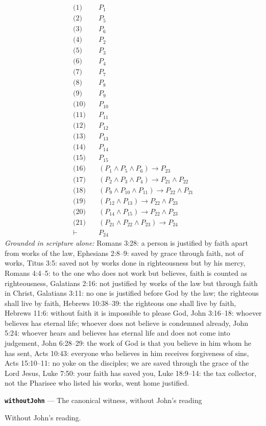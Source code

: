 \documentclass[11pt]{article}
\begin{document}
\begin{align*}
  \text{(1)} \quad & P_{1} \\
  \text{(2)} \quad & P_{5} \\
  \text{(3)} \quad & P_{6} \\
  \text{(4)} \quad & P_{2} \\
  \text{(5)} \quad & P_{3} \\
  \text{(6)} \quad & P_{4} \\
  \text{(7)} \quad & P_{7} \\
  \text{(8)} \quad & P_{8} \\
  \text{(9)} \quad & P_{9} \\
  \text{(10)} \quad & P_{10} \\
  \text{(11)} \quad & P_{11} \\
  \text{(12)} \quad & P_{12} \\
  \text{(13)} \quad & P_{13} \\
  \text{(14)} \quad & P_{14} \\
  \text{(15)} \quad & P_{15} \\
  \text{(16)} \quad & (P_{1} \land P_{5} \land P_{6}) \rightarrow P_{23} \\
  \text{(17)} \quad & (P_{2} \land P_{3} \land P_{4}) \rightarrow P_{21} \land P_{22} \\
  \text{(18)} \quad & (P_{9} \land P_{10} \land P_{11}) \rightarrow P_{22} \land P_{21} \\
  \text{(19)} \quad & (P_{12} \land P_{13}) \rightarrow P_{22} \land P_{23} \\
  \text{(20)} \quad & (P_{14} \land P_{15}) \rightarrow P_{22} \land P_{23} \\
  \text{(21)} \quad & (P_{21} \land P_{22} \land P_{23}) \rightarrow P_{24} \\
  \vdash \quad & P_{24}
\end{align*}
\emph{Grounded in scripture alone:} Romans 3:28: a person is justified by faith apart from works of the law, Ephesians 2:8–9: saved by grace through faith, not of works, Titus 3:5: saved not by works done in righteousness but by his mercy, Romans 4:4–5: to the one who does not work but believes, faith is counted as righteousness, Galatians 2:16: not justified by works of the law but through faith in Christ, Galatians 3:11: no one is justified before God by the law; the righteous shall live by faith, Hebrews 10:38–39: the righteous one shall live by faith, Hebrews 11:6: without faith it is impossible to please God, John 3:16–18: whoever believes has eternal life; whoever does not believe is condemned already, John 5:24: whoever hears and believes has eternal life and does not come into judgement, John 6:28–29: the work of God is that you believe in him whom he has sent, Acts 10:43: everyone who believes in him receives forgiveness of sins, Acts 15:10–11: no yoke on the disciples; we are saved through the grace of the Lord Jesus, Luke 7:50: your faith has saved you, Luke 18:9–14: the tax collector, not the Pharisee who listed his works, went home justified.
\par\medskip\noindent\textbf{\texttt{without\allowbreak{}John}} --- The canonical witness, without John's reading\par\nobreak\noindent
Without John's reading.
\end{document}
